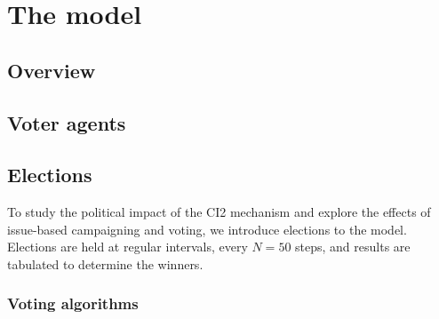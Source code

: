 \section{The model}
\label{sec:model}

\subsection{Overview}


\subsection{Voter agents}


\subsection{Elections}


To study the political impact of the CI2 mechanism and explore the effects of issue-based
campaigning and voting, we introduce elections to the model. Elections are held at regular
intervals, every $N=50$ steps, and results are tabulated to determine the winners. 

\subsubsection{Voting algorithms}


